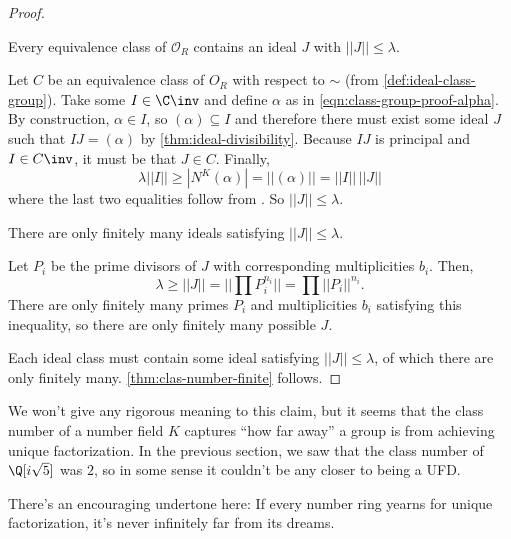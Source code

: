 \begin{proof}
    \medskip

    \begin{lemma}
        Every equivalence class of $\mathcal O_R$ contains an ideal $J$ with $||J|| \leq \lambda$.
    \end{lemma}

    Let $C$ be an equivalence class of $O_R$ with respect to $\sim$ (from \autoref{def:ideal-class-group}). Take some $I \in \C \inv$ and define $\alpha$ as in \autoref{eqn:class-group-proof-alpha}. By construction, $\alpha \in I$, so $(\alpha) \subseteq I$ and therefore there must exist some ideal $J$ such that $IJ = (\alpha)$ by \autoref{thm:ideal-divisibility}. Because $IJ$ is principal and $I \in C \inv$, it must be that $J \in C$. Finally,
    \begin{equation}
        \lambda ||I||
        \geq |N^K(\alpha)|
        = ||(\alpha)||
        = ||I|| \, ||J||
    \end{equation}
    where the last two equalities follow from \cite[Theorem 22]{marcus}. So $||J|| \leq \lambda$.

    \medskip

    \begin{lemma}
        There are only finitely many ideals satisfying $||J|| \leq \lambda$.
    \end{lemma}

    Let $P_i$ be the prime divisors of $J$ with corresponding multiplicities $b_i$.
    Then,
    \begin{equation}
        \lambda
        \geq ||J||
        = ||\prod P_i^{n_i}||
        = \prod ||P_i||^{n_i}.
    \end{equation}
    There are only finitely many primes $P_i$ and multiplicities $b_i$ satisfying this inequality, so there are only finitely many possible $J$.

    \medskip

    Each ideal class must contain some ideal satisfying $||J|| \leq \lambda$, of which there are only finitely many. \autoref{thm:clas-number-finite} follows.
\end{proof}

We won't give any rigorous meaning to this claim, but it seems that the class number of a number field $K$ captures ``how far away'' a group is from achieving unique factorization.
In the previous section, we saw that the class number of $\Q[i \sqrt5]$ was $2$, so in some sense it couldn't be any closer to being a UFD.

There's an encouraging undertone here: If every number ring yearns for unique factorization, it's never infinitely far from its dreams.

